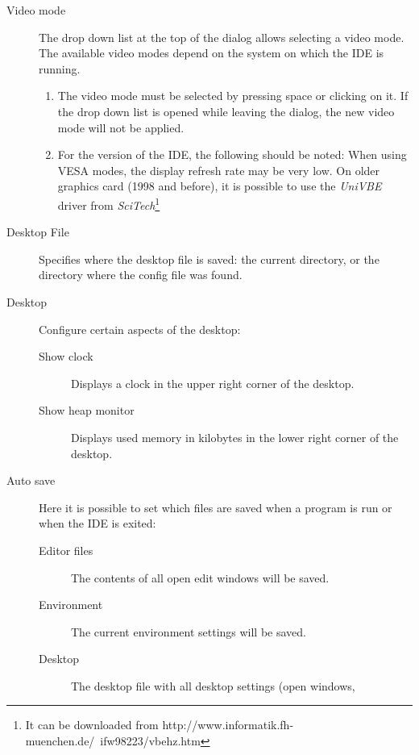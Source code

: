 \begin{description}
\item[Video mode]
The drop down list at the top of the dialog allows selecting a video mode.
The available video modes depend on the system on which the IDE
is running.
\begin{remark}
\begin{enumerate}
\item The video mode must be selected by pressing space or clicking
on it. If the drop down list is opened while leaving the dialog,
the new video mode will not be applied.
\item For the \dos version of the IDE, the following should be noted:
When using VESA modes, the display refresh rate may be very low.
On older graphics card (1998 and before), it is possible to use the
{\em UniVBE} driver from {\em SciTech}\footnote{It can be downloaded from
{http://www.informatik.fh-muenchen.de/~ifw98223/vbehz.htm}}
\end{enumerate}
\end{remark}
\item[Desktop File]
Specifies where the desktop file is saved: the current directory, or the
directory where the config file was found.
\item[Desktop]
Configure certain aspects of the desktop:
\begin{description}
\item[Show clock] Displays a clock in the upper right corner of the desktop.
\item[Show heap monitor] Displays used memory in kilobytes in the lower right
corner of the desktop.
\end{description}
\item[Auto save]
Here it is possible to set which files are saved when a program is run or
when the IDE is exited:
\begin{description}
\item[Editor files] The contents of all open edit windows will be saved.
\item[Environment] The current environment settings will be saved.
\item[Desktop] The desktop file with all desktop settings (open windows,

\end{description}
\end{description}
